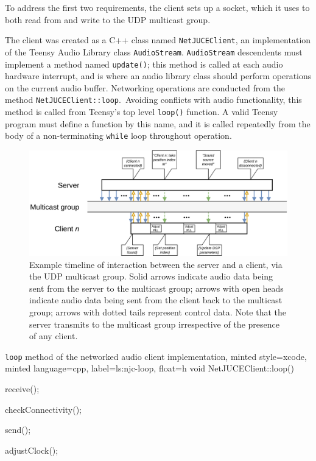 \documentclass[utf8]{FrontiersinHarvard}
\begin{document}
    To address the first two requirements, the client sets up a socket, which it
    uses to both read from and write to the UDP multicast group.

    The client was created as a C++ class named \texttt{NetJUCEClient}, an
    implementation of the Teensy Audio Library class \texttt{AudioStream}.
    \texttt{AudioStream} descendents must implement a method named
    \texttt{update()}; this method is called at each audio hardware interrupt, and
    is where an audio library class should perform operations on the current
    audio buffer.
    Networking operations are conducted from the method
    \texttt{NetJUCEClient::loop}.\
    Avoiding conflicts with audio functionality, this method is called from Teensy's
    top level \texttt{loop()} function.
    A valid Teensy program must define a function by this name, and it is called
    repeatedly from the body of a non-terminating \texttt{while} loop throughout
    operation.

    \begin{figure}[ht]
        \centering
        \includegraphics[width=\textwidth]{figures/timeline}
        \caption{
            Example timeline of interaction between the server and a client, via the
            UDP multicast group.
            Solid arrows indicate audio data being sent from the server to the
            multicast group;
            arrows with open heads indicate audio data being sent from the
            client back to the multicast group;
            arrows with dotted tails represent control data.
            Note that the server transmits to the multicast group irrespective of
            the presence of any client.
        }
        \label{fig:timeline}
    \end{figure}

    \begin{codelisting}{
        \texttt{loop} method of the networked audio client implementation,
        minted style=xcode,
        minted language=cpp,
        label=ls:njc-loop,
        float=h
    }
        void NetJUCEClient::loop() {
            receive();

            checkConnectivity();

            send();

            adjustClock();
        }
    \end{codelisting}
\end{document}
